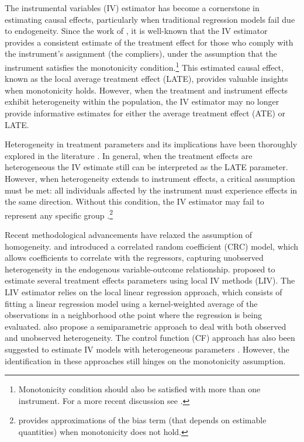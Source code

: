 \documentclass[12pt]{article}
\begin{document}
The instrumental variables (IV) estimator has become a cornerstone in estimating causal effects, particularly when traditional regression models fail due to endogeneity. Since the work of \cite{imbens1994identification}, it is well-known that the IV estimator provides a consistent estimate of the treatment effect for those who comply with the instrument's assignment (the compliers), under the assumption that the instrument satisfies the monotonicity condition.\footnote{Monotonicity condition should also be satisfied with more than one instrument. For a more recent discussion see \cite{mogstad2021causal}.}  This estimated causal effect, known as the local average treatment effect (LATE), provides valuable insights when monotonicity holds. However, when the treatment and instrument effects exhibit heterogeneity within the population, the IV estimator may no longer provide informative estimates for either the average treatment effect (ATE) or LATE.

Heterogeneity in treatment parameters and its implications have been thoroughly explored in the literature  \citep[e.g.,][]{angrist2004treatment,wooldridge2005unobserved, heckman2006understanding}. In general, when the treatment effects are heterogeneous the IV estimate still can be interpreted as the LATE parameter. However, when heterogeneity extends to instrument effects, a critical assumption must be met: all individuals affected by the instrument must experience effects in the same direction. Without this condition, the IV estimator may fail to represent any specific group \citep{heckman2006understanding, klein2010heterogeneous}.\footnote{\cite{klein2010heterogeneous} provides approximations of the bias term (that depends on estimable quantities) when monotonicity does not hold.}

Recent methodological advancements have relaxed the assumption of homogeneity. \cite{wooldridge1997two, wooldridge2003further} and \cite{heckman1998instrumental} introduced a correlated random coefficient (CRC) model, which allows coefficients to correlate with the regressors, capturing unobserved heterogeneity in the endogenous variable-outcome relationship. \cite{heckman1999local, heckman2007econometric} proposed to estimate several treatment effects parameters using local IV methods (LIV). The LIV estimator relies on the local linear regression approach, which consists of fitting a linear regression model using a kernel-weighted average of the observations in a neighborhood othe point where the regression is being evaluated. \cite{benini2022modeling} also propose a semiparametric approach to deal with both observed and unobserved heterogeneity.  The control function (CF) approach has also been suggested to estimate IV models with heterogeneous parameters \citep{wooldridge2005unobserved, florens2008identification,newey2022heterogeneous}. However, the identification in these approaches still hinges on the monotonicity assumption.
\end{document}
